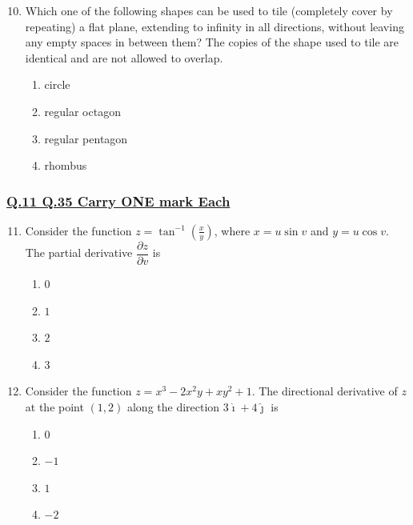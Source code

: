 \documentclass[journal]{IEEEtran}
\theoremstyle{remark}
\begin{document}
\begin{enumerate}[itemsep=1em]
\setcounter{enumi}{9}
\item  Which one of the following shapes can be used to tile (completely cover by repeating) a flat plane, extending to infinity in all directions, without leaving any empty spaces in between them? The copies of the shape used to tile are identical 
and are not allowed to overlap.
\begin{enumerate}[leftmargin=2.5em, labelsep=0.5em, itemsep=0.5em]
      \item circle
      \item regular octagon
      \item regular pentagon
      \item rhombus
\end{enumerate}

\end{enumerate}

\subsubsection{\underline{Q.11 \text{-} Q.35 Carry ONE mark Each}}

\begin{enumerate}[itemsep=1em]
\setcounter{enumi}{10}
\item Consider the function 
$ z = \tan^{-1}\!\left(\frac{x}{y}\right) $, 
where $ x = u \sin v $ and $y = u \cos v $.  
The partial derivative $\dfrac{\partial z}{\partial v}$ is 
\begin{multicols}{4}
\begin{enumerate}
     \item $0$
     \item $1$
     \item $2$
     \item $3$
\end{enumerate}
\end{multicols}

\end{enumerate}

\begin{enumerate}[itemsep=1em]
\setcounter{enumi}{11}
\item Consider the function \( z = x^{3} - 2x^{2}y + xy^{2} + 1 \).
The directional derivative of \(z\) at the point \((1,2)\) along the direction \(3\hat{\imath}+4\hat{\jmath}\) is 
\begin{multicols}{4}
\begin{enumerate}
      \item $0$
      \item $-1$
      \item $1$
      \item $-2$
\end{enumerate}
\end{multicols}

\end{enumerate}
\end{document}
